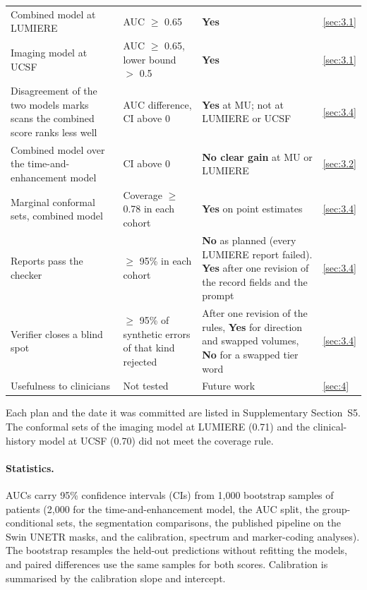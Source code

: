 \begin{table}[!htbp]
\begin{threeparttable}
\begin{tabularx}{\linewidth}{@{}R{4.0cm}R{3.9cm}LR{0.9cm}@{}}
Combined model at LUMIERE & AUC $\geq$ 0.65 & \textbf{Yes} & \ref{sec:3.1} \\
Imaging model at UCSF & AUC $\geq$ 0.65, lower bound $>$ 0.5 & \textbf{Yes} & \ref{sec:3.1} \\
Disagreement of the two models marks scans the combined score ranks less well & AUC difference, CI above 0 & \textbf{Yes} at MU; not at LUMIERE or UCSF & \ref{sec:3.4} \\
Combined model over the time-and-enhancement model & CI above 0 & \textbf{No clear gain} at MU or LUMIERE & \ref{sec:3.2} \\
Marginal conformal sets, combined model & Coverage $\geq$ 0.78 in each cohort & \textbf{Yes} on point estimates & \ref{sec:3.4} \\
Reports pass the checker & $\geq$ 95\% in each cohort & \textbf{No} as planned (every LUMIERE report failed). \textbf{Yes} after one revision of the record fields and the prompt & \ref{sec:3.4} \\
Verifier closes a blind spot & $\geq$ 95\% of synthetic errors of that kind rejected & After one revision of the rules, \textbf{Yes} for direction and swapped volumes, \textbf{No} for a swapped tier word & \ref{sec:3.4} \\
Usefulness to clinicians & Not tested & Future work & \ref{sec:4} \\
\bottomrule
\end{tabularx}
\begin{tablenotes}\footnotesize
\item Each plan and the date it was committed are listed in Supplementary Section~S5. The conformal sets of the imaging model at LUMIERE (0.71) and the clinical-history
model at UCSF (0.70) did not meet the coverage rule.
\end{tablenotes}
\end{threeparttable}
\end{table}

\paragraph*{Statistics.} AUCs carry 95\% confidence intervals (CIs) from 1,000 bootstrap samples of patients (2,000
for the time-and-enhancement model, the AUC split, the group-conditional sets, the segmentation comparisons, the
published pipeline on the Swin UNETR masks, and the calibration, spectrum and marker-coding analyses). The bootstrap
resamples the held-out predictions without refitting the models, and paired differences use the same samples for
both scores. Calibration is summarised by the calibration slope and intercept.

